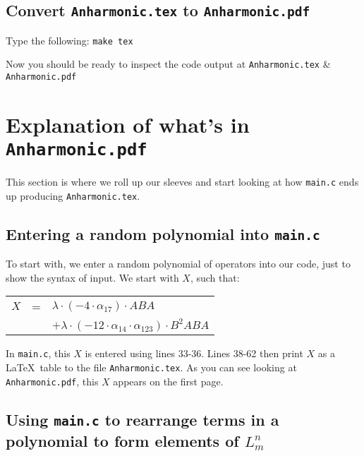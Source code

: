 \documentclass{article}
\begin{document}
\subsection{Convert \texttt{Anharmonic.tex} to \texttt{Anharmonic.pdf}}

Type the following: 
\newline
\newline
\texttt{make tex}
\newline
\newline

Now you should be ready to inspect the code output at \texttt{Anharmonic.tex} \& \texttt{Anharmonic.pdf}

\section{Explanation of what's in \texttt{Anharmonic.pdf}}

This section is where we roll up our sleeves and start looking at how \texttt{main.c} ends up producing \texttt{Anharmonic.tex}.

\subsection{Entering a random polynomial into \texttt{main.c}}

To start with, we enter a random polynomial of operators into our code, just to show the syntax of input. We start with $X$, such that:

\begin{table}[!hp]
\begin{center}
\begin{tabular}{rcl}
$X$ & = & ${\lambda}{\cdot}(-4{\cdot}{\alpha}_{17}){\cdot}ABA$ \\
 & & $ + {\lambda}{\cdot}(-12{\cdot}{\alpha}_{14}{\cdot}{\alpha}_{123}){\cdot}B^{2}ABA$ \\
\end{tabular}
\end{center}
\end{table}

In \texttt{main.c}, this $X$ is entered using lines 33-36. Lines 38-62 then print $X$ as a \LaTeX\ table to the file \texttt{Anharmonic.tex}. As you can see looking at \texttt{Anharmonic.pdf}, this $X$ appears on the first page.

\subsection{Using \texttt{main.c} to rearrange terms in a polynomial to form elements of $L^n_m$}
\end{document}
